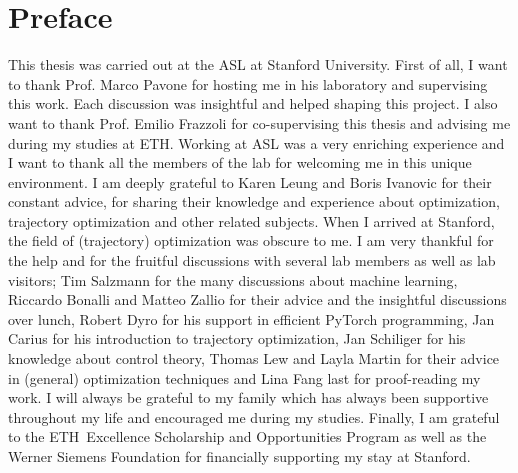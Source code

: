 \chapter*{Preface}
This thesis was carried out at the \ac{ASL} at Stanford University. First of all, I want to thank Prof. Marco Pavone for hosting me in his laboratory and supervising this work. Each discussion was insightful and helped shaping this project. I also want to thank Prof. Emilio Frazzoli for co-supervising this thesis and advising me during my studies at \ac{ETH}.
\newline
Working at \ac{ASL} was a very enriching experience and I want to thank all the members of the lab for welcoming me in this unique environment. I am deeply grateful to Karen Leung and Boris Ivanovic for their constant advice, for sharing their knowledge and experience about optimization, trajectory optimization and other related subjects.
\newline
When I arrived at Stanford, the field of (trajectory) optimization was obscure to me. I am very thankful for the help and for the fruitful discussions with several lab members as well as lab visitors; Tim Salzmann for the many discussions about machine learning, Riccardo Bonalli and Matteo Zallio for their advice and the insightful discussions over lunch, Robert Dyro for his support in efficient PyTorch programming, Jan Carius for his introduction to trajectory optimization, Jan Schiliger for his knowledge about control theory,  Thomas Lew and Layla Martin for their advice in (general) optimization techniques and Lina Fang last for proof-reading my work. I will always be grateful to my family which has always been supportive throughout my life and encouraged me during my studies. Finally, I am grateful to the \ac{ETH} Excellence Scholarship and Opportunities Program as well as the Werner Siemens Foundation for financially supporting my stay at Stanford.

\cleardoublepage